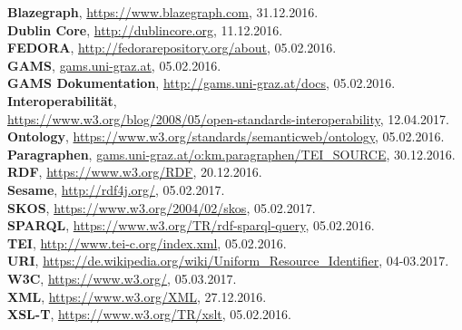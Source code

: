 \documentclass[12pt,a4paper]{article}
\begin{document}
\begin{singlespace}


\textbf{Blazegraph}, \url{https://www.blazegraph.com}, 31.12.2016.
\\


\textbf{Dublin Core}, \url{http://dublincore.org}, 11.12.2016.
\\

\textbf{FEDORA}, \url{http://fedorarepository.org/about}, 05.02.2016.
\\

\textbf{GAMS}, \url{gams.uni-graz.at}, 05.02.2016.
\\

\textbf{GAMS Dokumentation}, \url{http://gams.uni-graz.at/docs}, 05.02.2016.
\\

\textbf{Interoperabilität},\\ \url{https://www.w3.org/blog/2008/05/open-standards-interoperability}, 12.04.2017.
\\

\textbf{Ontology}, \url{https://www.w3.org/standards/semanticweb/ontology}, 05.02.2016.
\\

\textbf{Paragraphen}, \url{gams.uni-graz.at/o:km.paragraphen/TEI_SOURCE}, 30.12.2016.
\\

\textbf{RDF}, \url{https://www.w3.org/RDF}, 20.12.2016.
\\

\textbf{Sesame}, \url{http://rdf4j.org/}, 05.02.2017.
\\

\textbf{SKOS}, \url{https://www.w3.org/2004/02/skos}, 05.02.2017. 
\\

\textbf{SPARQL}, \url{https://www.w3.org/TR/rdf-sparql-query}, 05.02.2016.
\\

\textbf{TEI}, \url{http://www.tei-c.org/index.xml}, 05.02.2016.
\\

\textbf{URI}, \url{https://de.wikipedia.org/wiki/Uniform_Resource_Identifier}, 04-03.2017.
\\

\textbf{W3C}, \url{https://www.w3.org/}, 05.03.2017.
\\

\textbf{XML}, \url{https://www.w3.org/XML}, 27.12.2016.
\\

\textbf{XSL-T}, \url{https://www.w3.org/TR/xslt}, 05.02.2016.
\\

\end{singlespace}

 
\newpage


\newpage
\listoffigures
\end{document}
